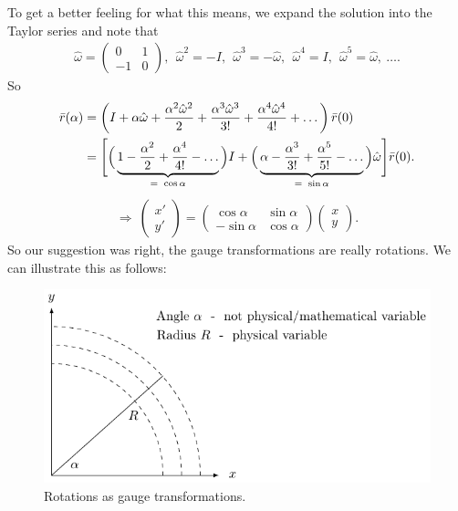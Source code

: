 To get a better feeling for what this means, we expand the solution into the Taylor series and note that
\begin{align}
\hat{\omega} = 
\begin{pmatrix}
    0 & 1 \\
    -1 & 0
\end{pmatrix}, \ \
\hat{\omega}^2 = - I, \ \
\hat{\omega}^3 = - \hat{\omega}, \ \
\hat{\omega}^4 = I, \ \
\hat{\omega}^5 = \hat{\omega}, \ \dots .
\end{align}
So 
\begin{align}
\bar{r}(\alpha) &= \left( I + \alpha \hat{\omega} + \frac{\alpha^2 \hat{\omega}^2}{2} + \frac{\alpha^3 \hat{\omega}^3}{3 !} + \frac{\alpha^4 \hat{\omega}^4}{4 !} + \dots  \right) \bar{r}(0) \notag \\
&= \Bigg [  \Big ( \underbrace{1 - \frac{\alpha^2}{2} + \frac{\alpha^4}{4 !} - \dots}_{\Large = \ \cos \alpha} \Big ) I + \Big ( \underbrace{\alpha - \frac{\alpha^3}{3 !} + \frac{\alpha^5}{5 !} - \dots}_{\Large = \ \sin \alpha} \Big ) \hat{\omega} \Bigg ] \bar{r}(0) .
\end{align}
\begin{align}
\Longrightarrow \ 
\begin{pmatrix}
    x' \\
    y'
\end{pmatrix} =
\begin{pmatrix}
    \cos \alpha & \sin \alpha \\
    - \sin \alpha & \cos \alpha
\end{pmatrix}
\begin{pmatrix}
    x \\
    y
\end{pmatrix}.
\end{align}
So our suggestion was right, the gauge transformations are really rotations.
We can illustrate this as follows:
\begin{figure}[H]
\begin{center}
\includegraphics[scale=1.4]{img/rotation.pdf}
\end{center}
\caption{Rotations as gauge transformations.}
\label{fig:3}
\end{figure}
